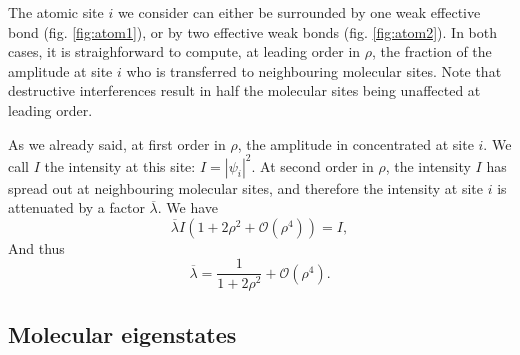 \documentclass[aps,prl,preprint]{revtex4-1}
\newcommand{\lb}{\ensuremath{\overline{\lambda}}}
\begin{document}
The atomic site $i$ we consider can either be surrounded by one weak effective bond (fig. \eqref{fig:atom1}), or by two effective weak bonds (fig. \eqref{fig:atom2}).
In both cases, it is straighforward to compute, at leading order in $\rho$, the fraction of the amplitude at site $i$ who is transferred to neighbouring molecular sites.
Note that destructive interferences result in half the molecular sites being unaffected at leading order.

As we already said, at first order in $\rho$, the amplitude in concentrated at site $i$. We call $I$ the intensity at this site: $I=|\psi_i|^2$. 
At second order in $\rho$, the intensity $I$ has spread out at neighbouring molecular sites, and therefore the intensity at site $i$ is attenuated by a factor $\lb$. We have
\begin{equation}
	\lb I ( 1 + 2\rho^2 + \mathcal{O}(\rho^4)) = I,
\end{equation}
And thus
\begin{equation}
	\lb = \frac{1}{1+2 \rho^2} + \mathcal{O}(\rho^4).
\end{equation}

\subsection{Molecular eigenstates}

\newpage



\end{document}
